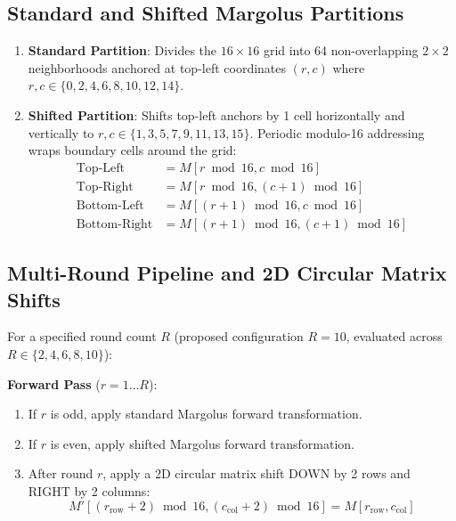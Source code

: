 \subsection{Standard and Shifted Margolus Partitions}
\label{subsec:partitions}
\begin{enumerate}
    \item \textbf{Standard Partition}: Divides the $16 \times 16$ grid into 64 non-overlapping $2 \times 2$ neighborhoods anchored at top-left coordinates $(r, c)$ where $r, c \in \{0, 2, 4, 6, 8, 10, 12, 14\}$.
    \item \textbf{Shifted Partition}: Shifts top-left anchors by 1 cell horizontally and vertically to $r, c \in \{1, 3, 5, 7, 9, 11, 13, 15\}$. Periodic modulo-16 addressing wraps boundary cells around the grid:
    \begin{align}
    \text{Top-Left} &= M[r \bmod 16, c \bmod 16] \\
    \text{Top-Right} &= M[r \bmod 16, (c+1) \bmod 16] \\
    \text{Bottom-Left} &= M[(r+1) \bmod 16, c \bmod 16] \\
    \text{Bottom-Right} &= M[(r+1) \bmod 16, (c+1) \bmod 16]
    \end{align}
\end{enumerate}

\subsection{Multi-Round Pipeline and 2D Circular Matrix Shifts}
\label{subsec:round_pipeline}
For a specified round count $R$ (proposed configuration $R = 10$, evaluated across $R \in \{2, 4, 6, 8, 10\}$):

\textbf{Forward Pass} ($r = 1 \dots R$):
\begin{enumerate}
    \item If $r$ is odd, apply standard Margolus forward transformation.
    \item If $r$ is even, apply shifted Margolus forward transformation.
    \item After round $r$, apply a 2D circular matrix shift DOWN by 2 rows and RIGHT by 2 columns:
    \begin{equation}
    M'[(r_{\text{row}} + 2) \bmod 16, (c_{\text{col}} + 2) \bmod 16] = M[r_{\text{row}}, c_{\text{col}}]
    \label{eq:shift_down_right}
    \end{equation}
\end{enumerate}

